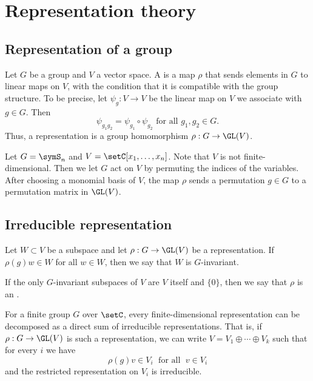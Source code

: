 
\section[representationTheory]{Representation theory}

\subsection[representationDefinition]{Representation of a group}


Let $G$ be a group and $V$ a vector space. A
\label{groupRepresentation}
is a map $\rho$ that sends elements in $G$ to linear maps on $V$,
with the condition that it is compatible with the group structure.
To be precise, let $\psi_g : V \to V$ be the linear map on $V$ we associate
with $g \in G$.
Then
\[
\psi_{g_1 g_2} = \psi_{g_1} \circ \psi_{g_2} \text{ for all } g_1,g_2 \in G.
\]
Thus, a representation is a group homomorphism $\rho : G \to \GL(V)$.

\begin{example}
Let $G = \symS_n$ and $V=\setC[x_1,\dotsc,x_n]$.
Note that $V$ is not finite-dimensional.
Then we let $G$ act on $V$ by permuting the indices of the variables.
After choosing a monomial basis of $V$, the map $\rho$ sends a permutation
$g \in G$ to a permutation matrix in $\GL(V)$.
\end{example}


\subsection[representationIrreducible]{Irreducible representation}

Let $W \subset V$ be a subspace and let $\rho:G \to \GL(V)$ be a representation.
If $\rho(g)w \in W$ for all $w \in W$, then we say that $W$ is $G$-invariant.

If the only $G$-invariant subspaces of $V$ are $V$ itself and $\{0\}$, then
we say that $\rho$ is an
\label{irreducibleRepresentationDefinition}.

For a finite group $G$ over $\setC$, every finite-dimensional representation
can be decomposed as a direct sum of irreducible representations.  That is, if
$\rho: G \to \GL(V)$ is such a representation, we can write
$V = V_1 \oplus \dotsb \oplus V_k$ such that for every $i$ we have
\[
\rho(g) v \in V_i \; \text{ for all }\; v \in V_i
\]
and the restricted representation on $V_i$ is irreducible.


